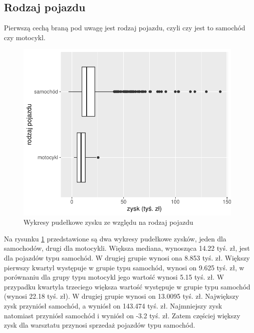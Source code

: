 \documentclass{article}\usepackage[]{graphicx}\usepackage[]{xcolor}
\makeatletter
\def\maxwidth{ %
  \ifdim\Gin@nat@width>\linewidth
    \linewidth
  \else
    \Gin@nat@width
  \fi
}
\newenvironment{knitrout}{}{} %
\makeatother
\begin{document}
\subsection{Rodzaj pojazdu}

Pierwszą cechą braną pod uwagę jest rodzaj pojazdu, czyli czy jest to samochód czy motocykl.

\begin{knitrout}
\color{fgcolor}\begin{figure}[H]

{\centering \includegraphics[width=\maxwidth]{figure/fig_typ-1} 

}

\caption[Wykresy pudełkowe zysku ze względu na rodzaj pojazdu]{Wykresy pudełkowe zysku ze względu na rodzaj pojazdu}\label{fig:fig_typ}
\end{figure}

\end{knitrout}

Na rysunku \ref{fig:fig_typ} przedstawione są dwa wykresy pudełkowe zysków, jeden dla samochodów, drugi dla motocykli. Większa mediana, wynosząca 14.22 tyś. zł, jest dla pojazdów typu samochód. W drugiej grupie wynosi ona 8.853 tyś. zł. 
Większy pierwszy kwartyl występuje w grupie typu samochód, wynosi on 9.625 tyś. zł, w porównaniu dla grupy typu motocykl jego wartość wynosi 5.15 tyś. zł.
W przypadku kwartyla trzeciego większa wartość występuje w grupie typu samochód (wynosi 22.18 tyś. zł). W drugiej grupie wynosi on 13.0095 tyś. zł.
Największy zysk przyniósł samochód, a wyniósł on 143.474 tyś. zł. 
Najmniejszy zysk natomiast przyniósł samochód i wyniósł on -3.2 tyś. zł. Zatem częściej większy zysk dla warsztatu przynosi sprzedaż pojazdów typu samochód. 
\end{document}
